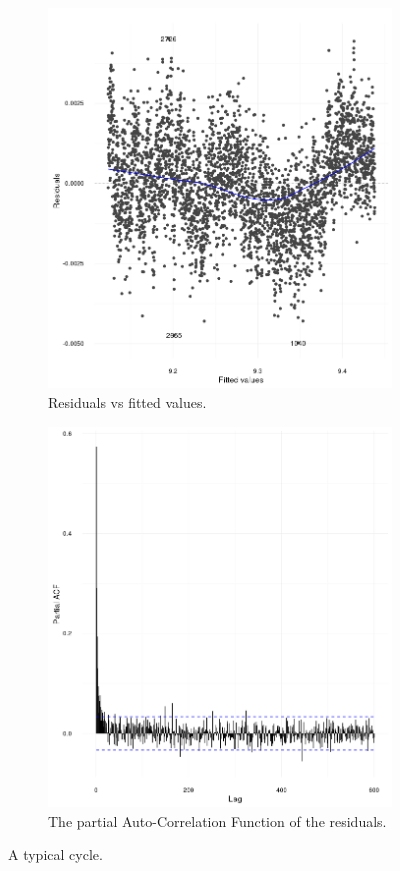 \documentclass[reprint]{revtex4-1}
\newcommand{\scl}{.39}
\begin{document}
\begin{figure}
\centering
\begin{subfigure}{.5\textwidth}
\includegraphics[scale=\scl]{../img/Run969_Res_VS_Fit}
\caption{Residuals vs fitted values.}
\end{subfigure}
\begin{subfigure}{.5\textwidth}
\includegraphics[scale=\scl]{../img/Run969_residual_PACF}
\caption{The partial Auto-Correlation Function of the residuals.}
\end{subfigure}
\caption{A typical cycle.\label{fig:Run969}}
\end{figure}
\end{document}
